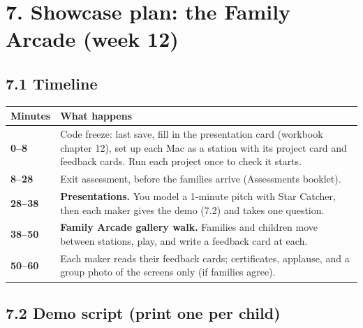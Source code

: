 \documentclass[level=2,teacher]{kidscode}
\begin{document}
\section{7. Showcase plan: the Family Arcade (week 12)}
\subsection{7.1 Timeline}
{\renewcommand{\arraystretch}{1.3}
\begin{longtable}{@{}>{\bfseries}p{1.8cm}>{\raggedright\arraybackslash}p{12.8cm}@{}}
\toprule
Minutes & What happens \\ \midrule\endhead
0--8 & Code freeze: last save, fill in the presentation card (workbook chapter 12), set up each Mac as a station with its project card and feedback cards. Run each project once to check it starts. \\
8--28 & Exit assessment, before the families arrive (Assessments booklet). \\
28--38 & \textbf{Presentations.} You model a 1-minute pitch with Star Catcher, then each maker gives the demo (7.2) and takes one question. \\
38--50 & \textbf{Family Arcade gallery walk.} Families and children move between stations, play, and write a feedback card at each. \\
50--60 & Each maker reads their feedback cards; certificates, applause, and a group photo of the screens only (if families agree). \\
\bottomrule
\end{longtable}}

\subsection{7.2 Demo script (print one per child)}
\begin{teacherscript}
\end{teacherscript}
\end{document}
